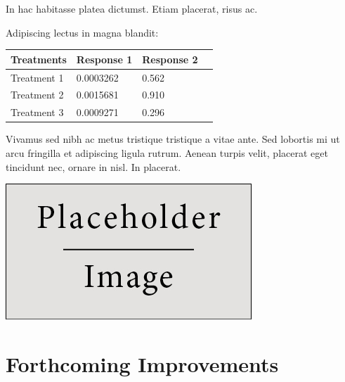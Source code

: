 \documentclass[a0,portrait]{a0poster}
\begin{document}
\begin{multicols}{2}
In hac habitasse platea dictumst. Etiam placerat, risus ac.

Adipiscing lectus in magna blandit:

\begin{center}\vspace{1cm}
\begin{tabular}{l l l l}
\toprule
\textbf{Treatments} & \textbf{Response 1} & \textbf{Response 2} \\
\midrule
Treatment 1 & 0.0003262 & 0.562 \\
Treatment 2 & 0.0015681 & 0.910 \\
Treatment 3 & 0.0009271 & 0.296 \\
\bottomrule
\end{tabular}
\end{center}\vspace{1cm}

Vivamus sed nibh ac metus tristique tristique a vitae ante. Sed lobortis mi ut arcu fringilla et adipiscing ligula rutrum. Aenean turpis velit, placerat eget tincidunt nec, ornare in nisl. In placerat.

\begin{center}\vspace{1cm}
\includegraphics[width=0.8\linewidth]{placeholder}
\end{center}\vspace{1cm}


\section*{Forthcoming Improvements}




\end{multicols}
\end{document}
